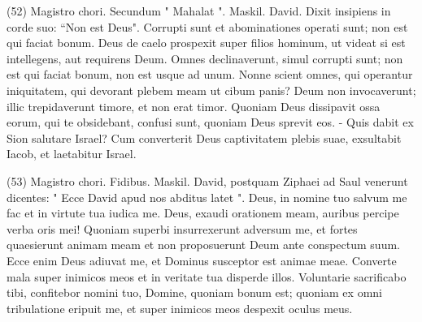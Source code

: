 \begin{biblechapter}  (52) 
\verse  Magistro chori. Secundum " Mahalat ". Maskil. David. Dixit insipiens in corde suo: “Non est Deus". 
\verse Corrupti sunt et abominationes operati sunt; non est qui faciat bonum. 
\verse Deus de caelo prospexit super filios hominum, ut videat si est intellegens, aut requirens Deum. 
\verse Omnes declinaverunt, simul corrupti sunt; non est qui faciat bonum, non est usque ad unum. 
\verse Nonne scient omnes, qui operantur iniquitatem, qui devorant plebem meam ut cibum panis? Deum non invocaverunt; 
\verse illic trepidaverunt timore, et non erat timor. Quoniam Deus dissipavit ossa eorum, qui te obsidebant, confusi sunt, quoniam Deus sprevit eos. - 
\verse Quis dabit ex Sion salutare Israel? Cum converterit Deus captivitatem plebis suae, exsultabit Iacob, et laetabitur Israel. 
\end{biblechapter}

\begin{biblechapter}  (53) 
\verse  Magistro chori. Fidibus. Maskil. David, 
\verse postquam Ziphaei ad Saul venerunt dicentes: " Ecce David apud nos abditus latet ". 
\verse Deus, in nomine tuo salvum me fac et in virtute tua iudica me. 
\verse Deus, exaudi orationem meam, auribus percipe verba oris mei! 
\verse Quoniam superbi insurrexerunt adversum me, et fortes quaesierunt animam meam et non proposuerunt Deum ante conspectum suum. 
\verse Ecce enim Deus adiuvat me, et Dominus susceptor est animae meae. 
\verse Converte mala super inimicos meos et in veritate tua disperde illos. 
\verse Voluntarie sacrificabo tibi, confitebor nomini tuo, Domine, quoniam bonum est; 
\verse quoniam ex omni tribulatione eripuit me, et super inimicos meos despexit oculus meus. 
\end{biblechapter}

